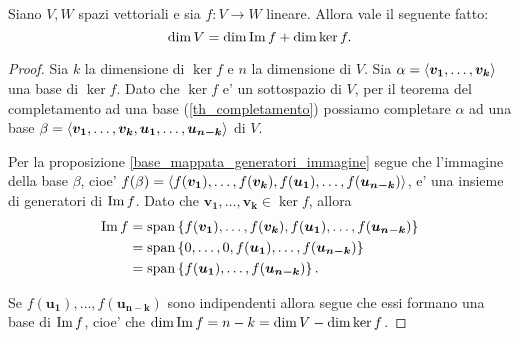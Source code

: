 \begin{theorem} 
     \label{th_dimensioni}
    Siano $V, W$ spazi vettoriali e sia $f : V \to W$ lineare. Allora vale il seguente fatto:
    \begin{equation}
        \dim V = \dim \operatorname{Im}f + \dim \ker f.
    \end{equation}
\end{theorem}
\begin{proof}
    Sia $k$ la dimensione di $\ker f$ e $n$ la dimensione di $V$.
    Sia $\alpha = \left\langle \bm{v_1}, \dots, \bm{v_k} \right\rangle$ una base di $\ker f$. Dato che $\ker f$ e' un sottospazio di $V$, per il teorema del completamento ad una base (\ref{th_completamento}) possiamo completare $\alpha$ ad una base $\beta = \left\langle \bm{v_1}, \dots, \bm{v_k}, \bm{u_1}, \dots, \bm{u_{n-k}} \right\rangle$ di $V$.

    Per la proposizione \ref{base_mappata_generatori_immagine} segue che l'immagine della base $\beta$, cioe' $f(\beta) = \left\langle f(\bm{v_1}), \dots, f(\bm{v_k}), f(\bm{u_1}), \dots, f(\bm{u_{n-k}}) \right\rangle$, e' una insieme di generatori di $\operatorname{Im}f$. Dato che $\bm{v_1}, \dots, \bm{v_k} \in \ker f$, allora \begin{alignat*}
        {1}
        \operatorname{Im}f &= \operatorname{span}\left\{f(\bm{v_1}), \dots, f(\bm{v_k}), f(\bm{u_1}), \dots, f(\bm{u_{n-k}})\right\}\\
        &= \operatorname{span}\left\{0, \dots, 0, f(\bm{u_1}), \dots, f(\bm{u_{n-k}})\right\}\\
        &= \operatorname{span}\left\{f(\bm{u_1}), \dots, f(\bm{u_{n-k}})\right\}.
    \end{alignat*}

    Se $f(\bm{u_1}), \dots, f(\bm{u_{n-k}})$ sono indipendenti allora segue che essi formano una base di $\operatorname{Im}f$, cioe' che $\dim \operatorname{Im}f = n - k = \dim V - \dim \ker f$.


\end{proof}
